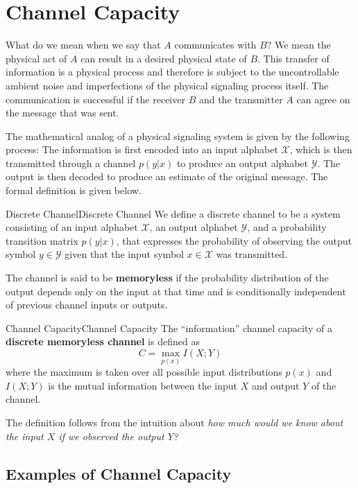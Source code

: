\documentclass[../main.tex]{subfiles}
\begin{document}
\chapter{Channel Capacity}
What do we mean when we say that $A$ communicates with $B$? We mean the physical act of $A$ can result in a desired physical state of $B$. This transfer of information is a physical process and therefore is subject to the uncontrollable ambient noise and imperfections of the physical signaling process itself. The communication is successful if the receiver $B$ and the transmitter $A$ can agree on the message that was sent.

The mathematical analog of a physical signaling system is given by the following process: The information is first encoded into an input alphabet $\mathcal{X}$, which is then transmitted through a channel $p(y|x)$ to produce an output alphabet $\mathcal{Y}$. The output is then decoded to produce an estimate of the original message. The formal definition is given below.

\begin{definition}{Discrete Channel}{Discrete Channel}
	We define a discrete channel to be a system consisting of an input alphabet $\mathcal{X}$, an output alphabet $\mathcal{Y}$, and a probability transition matrix $p(y|x)$, that expresses the probability of observing the output symbol $y \in \mathcal{Y}$ given that the input symbol $x \in \mathcal{X}$ was transmitted.

	The channel is said to be \textbf{memoryless} if the probability distribution of the output depends only on the input at that time and is conditionally independent of previous channel inputs or outputs.
\end{definition}

\begin{definition}{Channel Capacity}{Channel Capacity}
	The ``information'' channel capacity of a \textbf{discrete memoryless channel} is defined as
	\begin{equation}
		C = \max_{p(x)} I(X;Y)
	\end{equation}
	where the maximum is taken over all possible input distributions $p(x)$ and $I(X;Y)$ is the mutual information between the input $X$ and output $Y$ of the channel.
\end{definition}

The definition follows from the intuition about \emph{how much would we know about the input $X$ if we observed the output $Y$?}

\section{Examples of Channel Capacity}
\end{document}
